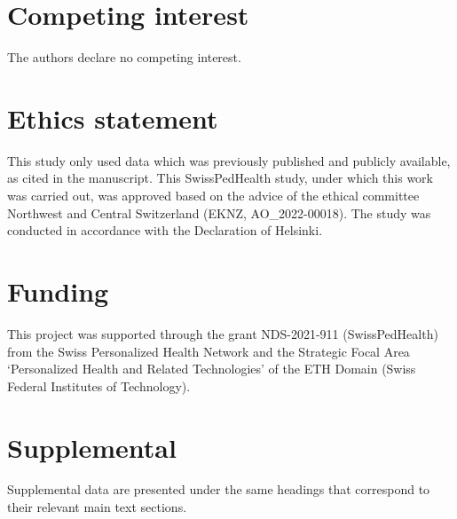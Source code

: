 \section*{Competing interest}
\noindent
The authors declare no competing interest. 

\section*{Ethics statement}
\noindent
This study only used data which was previously published and publicly available, as cited in the manuscript.
This  SwissPedHealth study, under which this work was carried out, was approved based on the advice of the ethical committee Northwest and Central Switzerland (EKNZ, AO\_2022-00018). 
The study was conducted in accordance with the Declaration of Helsinki.

\section*{Funding}
\noindent This project was supported through the grant NDS-2021-911 (SwissPedHealth) from the Swiss Personalized Health Network and the Strategic Focal Area `Personalized Health and Related Technologies' of the ETH Domain (Swiss Federal Institutes of Technology).




\clearpage
\beginsupplement
\section{Supplemental} \label{Supplemental_text}

Supplemental data are presented under the same headings that correspond to their relevant main text sections. 

